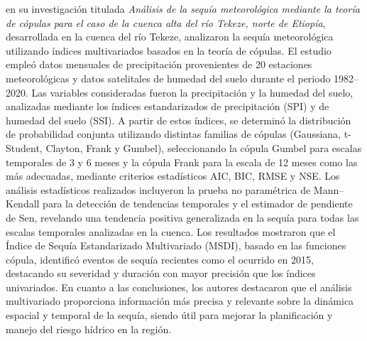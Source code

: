 \textcite{Menna2022} en su investigación titulada \emph{Análisis de la sequía meteorológica mediante la teoría de cópulas para el caso de la cuenca alta del río Tekeze, norte de Etiopía}, desarrollada en la cuenca del río Tekeze, analizaron la sequía meteorológica utilizando índices multivariados basados en la teoría de cópulas. El estudio empleó datos mensuales de precipitación provenientes de 20 estaciones meteorológicas y datos satelitales de humedad del suelo durante el periodo 1982–2020. Las variables consideradas fueron la precipitación y la humedad del suelo, analizadas mediante los índices estandarizados de precipitación (SPI) y de humedad del suelo (SSI). A partir de estos índices, se determinó la distribución de probabilidad conjunta utilizando distintas familias de cópulas (Gaussiana, t-Student, Clayton, Frank y Gumbel), seleccionando la cópula Gumbel para escalas temporales de 3 y 6 meses y la cópula Frank para la escala de 12 meses como las más adecuadas, mediante criterios estadísticos AIC, BIC, RMSE y NSE. Los análisis estadísticos realizados incluyeron la prueba no paramétrica de Mann–Kendall para la detección de tendencias temporales y el estimador de pendiente de Sen, revelando una tendencia positiva generalizada en la sequía para todas las escalas temporales analizadas en la cuenca. Los resultados mostraron que el Índice de Sequía Estandarizado Multivariado (MSDI), basado en las funciones cópula, identificó eventos de sequía recientes como el ocurrido en 2015, destacando su severidad y duración con mayor precisión que los índices univariados. En cuanto a las conclusiones, los autores destacaron que el análisis multivariado proporciona información más precisa y relevante sobre la dinámica espacial y temporal de la sequía, siendo útil para mejorar la planificación y manejo del riesgo hídrico en la región.

